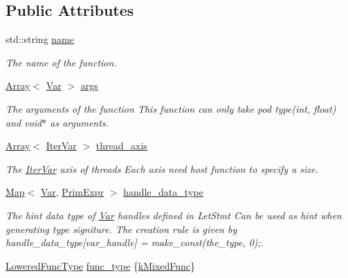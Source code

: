 \subsection*{Public Attributes}
\begin{DoxyCompactItemize}
\item 
std\+::string \hyperlink{classtvm_1_1tir_1_1LoweredFuncNode_afdd73b0418a0e703e755046836aef3d6}{name}
\begin{DoxyCompactList}\small\item\em The name of the function. \end{DoxyCompactList}\item 
\hyperlink{classtvm_1_1Array}{Array}$<$ \hyperlink{classtvm_1_1tir_1_1Var}{Var} $>$ \hyperlink{classtvm_1_1tir_1_1LoweredFuncNode_aef9d2a7ee866a22b3bd65f8c29a6016e}{args}
\begin{DoxyCompactList}\small\item\em The arguments of the function This function can only take pod type(int, float) and void$\ast$ as arguments. \end{DoxyCompactList}\item 
\hyperlink{classtvm_1_1Array}{Array}$<$ \hyperlink{classtvm_1_1tir_1_1IterVar}{Iter\+Var} $>$ \hyperlink{classtvm_1_1tir_1_1LoweredFuncNode_a844230451f80a6bea09bb81527d032df}{thread\+\_\+axis}
\begin{DoxyCompactList}\small\item\em The \hyperlink{classtvm_1_1tir_1_1IterVar}{Iter\+Var} axis of threads Each axis need host function to specify a size. \end{DoxyCompactList}\item 
\hyperlink{classtvm_1_1Map}{Map}$<$ \hyperlink{classtvm_1_1tir_1_1Var}{Var}, \hyperlink{classtvm_1_1PrimExpr}{Prim\+Expr} $>$ \hyperlink{classtvm_1_1tir_1_1LoweredFuncNode_a95a0481bbb70cdedde6b73717f49c1bc}{handle\+\_\+data\+\_\+type}
\begin{DoxyCompactList}\small\item\em The hint data type of \hyperlink{classtvm_1_1tir_1_1Var}{Var} handles defined in Let\+Stmt Can be used as hint when generating type signiture. The creation rule is given by handle\+\_\+data\+\_\+type\mbox{[}var\+\_\+handle\mbox{]} = make\+\_\+const(the\+\_\+type, 0);. \end{DoxyCompactList}\item 
\hyperlink{namespacetvm_1_1tir_a69f0089a367b98e377b652186fa7dc66}{Lowered\+Func\+Type} \hyperlink{classtvm_1_1tir_1_1LoweredFuncNode_aa59a716bf8a2ca84fb2b20a0fa1e25a4}{func\+\_\+type} \{\hyperlink{namespacetvm_1_1tir_a69f0089a367b98e377b652186fa7dc66accd368fda1b61f733343349a79cf2ca9}{k\+Mixed\+Func}\}

\end{DoxyCompactItemize}
